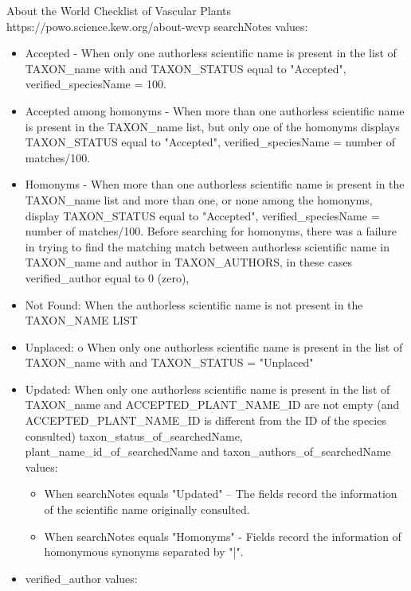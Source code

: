 \documentclass[a4paper]{book}
\begin{document}
%
\begin{Details}
About the World Checklist of Vascular Plants https://powo.science.kew.org/about-wcvp
searchNotes values:
\begin{itemize}

\item{} Accepted - When only one authorless scientific name is present in the list of TAXON\_name with
and TAXON\_STATUS equal to "Accepted",
verified\_speciesName = 100.
\item{} Accepted among homonyms - When more than one authorless scientific name is present in the
TAXON\_name list, but only one of the homonyms displays TAXON\_STATUS equal to "Accepted",
verified\_speciesName = number of matches/100.
\item{} Homonyms - When more than one authorless scientific name is present in the TAXON\_name list
and more than one, or none among the homonyms, display TAXON\_STATUS equal to "Accepted",
verified\_speciesName = number of matches/100.
Before searching for homonyms, there was a failure in trying to find the matching match between
authorless scientific name in TAXON\_name and author in TAXON\_AUTHORS, in these cases
verified\_author equal to 0 (zero),
\item{} Not Found: When the authorless scientific name is not present in the TAXON\_NAME LIST
\item{} Unplaced: o	When only one authorless scientific name is present in the list of TAXON\_name with and TAXON\_STATUS = "Unplaced"
\item{} Updated: When only one authorless scientific name is present in the list of TAXON\_name and ACCEPTED\_PLANT\_NAME\_ID
are not empty (and ACCEPTED\_PLANT\_NAME\_ID is different from the ID of the species consulted) taxon\_status\_of\_searchedName, plant\_name\_id\_of\_searchedName and taxon\_authors\_of\_searchedName values:
\begin{itemize}

\item{} When searchNotes equals "Updated" – The fields record the information of the scientific name originally consulted.
\item{} When searchNotes equals "Homonyms" - Fields record the information of homonymous synonyms separated by "|".

\end{itemize}

\item{} verified\_author values:
\begin{itemize}


\end{itemize}
\end{itemize}
\end{Details}
\end{document}
